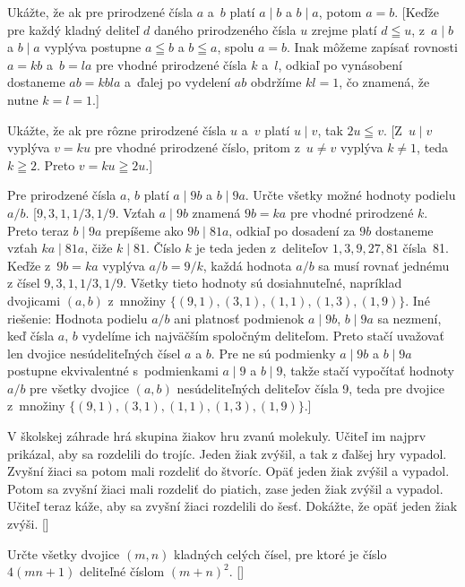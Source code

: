 {Ukážte, že ak pre prirodzené čísla $a$ a~$b$
platí $a \mid b$ a $b \mid a$, potom $a=b$.
[Keďže pre každý kladný deliteľ $d$ daného prirodzeného čísla $u$
zrejme platí $d\leqq u$, z~$a \mid b$ a $b \mid a$ vyplýva postupne
$a\leqq b$ a $b\leqq a$, spolu $a=b$.
Inak môžeme zapísať rovnosti $a=kb$ a~$b=la$ pre
vhodné prirodzené čísla $k$ a~$l$, odkiaľ po vynásobení dostaneme
$ab=kbla$ a~ďalej po vydelení $ab$ obdržíme $kl=1$, čo znamená,
že nutne $k=l=1.$]

Ukážte, že ak pre rôzne prirodzené čísla $u$ a~$v$
platí $u \mid v$, tak $2u\leqq v$.
[Z~$u \mid v$ vyplýva $v=ku$ pre vhodné prirodzené číslo, pritom
z~$u\ne v$ vyplýva $k\ne1$, teda $k\geqq2$. Preto $v=ku\geqq2u$.]

\D
Pre prirodzené čísla $a$, $b$ platí $a\mid9b$ a $b\mid9a$.
Určte všetky možné hodnoty podielu $a/b$.
[$9,3,1,1/3,1/9$. Vzťah $a\mid 9b$ znamená $9b=ka$
pre vhodné prirodzené $k$. Preto teraz $b \mid 9a$ prepíšeme
ako $9b\mid 81a$, odkiaľ po dosadení za $9b$ dostaneme
vzťah $ka\mid 81a$, čiže $k\mid 81$. Číslo $k$ je teda
jeden z~deliteľov $1,3,9,27,81$ čísla~81.
Keďže z~$9b=ka$ vyplýva $a/b=9/k$, každá hodnota $a/b$ sa musí
rovnať jednému z čísel $9,3,1,1/3,1/9$. Všetky tieto hodnoty
sú dosiahnuteľné, napríklad dvojicami $(a,b)$ z~množiny
$\{(9,1), (3,1), (1,1), (1,3), (1,9)\}$. Iné riešenie: Hodnota podielu
$a/b$ ani platnosť podmienok $a\mid9b$, $b\mid9a$ sa nezmení, keď
čísla $a$, $b$ vydelíme ich najväčším spoločným deliteľom.
Preto stačí uvažovať len dvojice nesúdeliteľných čísel $a$ a $b$.
Pre ne sú podmienky $a\mid9b$ a $b\mid9a$ postupne
ekvivalentné s~podmienkami $a\mid9$ a $b\mid9$, takže stačí
vypočítať hodnoty $a/b$ pre všetky dvojice $(a,b)$ nesúdeliteľných
deliteľov čísla 9, teda pre dvojice z~množiny
$\{(9,1), (3,1), (1,1), (1,3), (1,9)\}$.]

V školskej záhrade hrá skupina žiakov hru zvanú molekuly. Učiteľ im najprv prikázal, aby sa rozdelili do trojíc.
Jeden žiak zvýšil, a tak z ďalšej hry vypadol. Zvyšní žiaci sa potom mali rozdeliť do štvoríc. Opäť jeden žiak zvýšil
a vypadol. Potom sa zvyšní žiaci mali rozdeliť do piatich, zase jeden žiak zvýšil a vypadol. Učiteľ teraz káže, aby
sa zvyšní žiaci rozdelili do šesť. Dokážte, že opäť jeden žiak zvýši.
[]

Určte všetky dvojice $(m,n)$ kladných celých čísel, pre ktoré je číslo $4(mn+1)$ deliteľné číslom $(m+n)^2$.
[]

}
